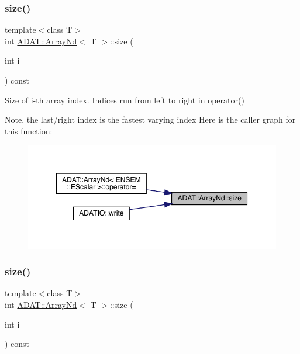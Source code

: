 \subsubsection{\texorpdfstring{size()}{size()}\hspace{0.1cm}{\footnotesize\ttfamily [2/6]}}
{\footnotesize\ttfamily template$<$class T$>$ \\
int \mbox{\hyperlink{classADAT_1_1ArrayNd}{A\+D\+A\+T\+::\+Array\+Nd}}$<$ T $>$\+::size (\begin{DoxyParamCaption}\item[{int}]{i }\end{DoxyParamCaption}) const\hspace{0.3cm}{\ttfamily [inline]}}



Size of i-\/th array index. Indices run from left to right in operator() 

Note, the last/right index is the fastest varying index Here is the caller graph for this function\+:
\nopagebreak
\begin{figure}[H]
\begin{center}
\leavevmode
\includegraphics[width=350pt]{d1/db2/classADAT_1_1ArrayNd_aa289b2d57b41dc1c61d061865e6cb912_icgraph}
\end{center}
\end{figure}
\mbox{\label{classADAT_1_1ArrayNd_aa289b2d57b41dc1c61d061865e6cb912}} 
\subsubsection{\texorpdfstring{size()}{size()}\hspace{0.1cm}{\footnotesize\ttfamily [3/6]}}
{\footnotesize\ttfamily template$<$class T$>$ \\
int \mbox{\hyperlink{classADAT_1_1ArrayNd}{A\+D\+A\+T\+::\+Array\+Nd}}$<$ T $>$\+::size (\begin{DoxyParamCaption}\item[{int}]{i }\end{DoxyParamCaption}) const\hspace{0.3cm}{\ttfamily [inline]}}




